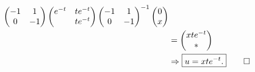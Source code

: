 \documentclass[hidelinks]{ctexart}
\begin{document}
\begin{solution}
\begin{align*}
\begin{pmatrix}
            -1 & 1 \\
            0 & -1
        \end{pmatrix}\begin{pmatrix}
            e^{-t} & te^{-t} \\
            & te^{-t}
        \end{pmatrix}\begin{pmatrix}
            -1 & 1 \\
            0 & -1
        \end{pmatrix}^{-1} \begin{pmatrix}
            0 \\ x
        \end{pmatrix} \\
        &= \begin{pmatrix}
            xte^{-t} \\
            *
        \end{pmatrix}\\
        & \Rightarrow \boxed{u = xte^{-t}.} \qedhere
    \end{align*}
\end{solution}

\end{document}
